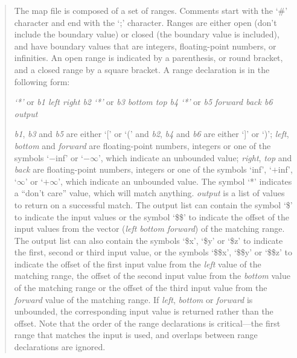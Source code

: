 \begin{quote}
The map file is composed of a set of ranges.
Comments start with the `\#' character and end with the `;' character.
Ranges are either open (don't include the boundary value) or closed (the boundary value is included),
and have boundary values that are integers, floating-point numbers, or infinities.
An open range is indicated by a parenthesis, or round bracket, and a closed range by a square bracket.
A range declaration is in the following form:

\centerline{\emph{`*'} or \emph{b1 left right b2} \emph{`*'} or \emph{b3 bottom top b4} \emph{`*'} or \emph{b5 forward back b6 output}}

\emph{b1}, \emph{b3} and \emph{b5} are either `[' or `(' and \emph{b2}, \emph{b4} and \emph{b6} are
either `]' or `)';
\emph{left}, \emph{bottom} and \emph{forward} are floating-point numbers, integers or one of the symbols `$-$inf' or
`$-\infty$', which indicate an unbounded value;
\emph{right}, \emph{top} and \emph{back} are floating-point numbers, integers or one of the symbols `inf', `$+$inf',
`$\infty$' or `$+\infty$', which indicate an unbounded value.
The symbol `*' indicates a ``don't care'' value, which will match anything.
\emph{output} is a list of values to return on a successful match.
The output list can contain the symbol `\$' to indicate the input values or the symbol `\$\$' to
indicate the offset of the input values from the vector (\emph{left} \emph{bottom} \emph{forward}) of the
matching range.
The output list can also contain the symbols `\$x', `\$y' or `\$z' to indicate the first, second or third
input value, or the symbols `\$\$x', `\$\$y' or `\$\$z' to indicate the offset of the first input value from
the \emph{left} value of the matching range, the offset of the second input value from the \emph{bottom} value
of the matching range or the offset of the third input value from the \emph{forward} value of the matching
range.
If \emph{left}, \emph{bottom} or \emph{forward} is unbounded, the corresponding input value is returned rather
than the offset.
Note that the order of the range declarations is critical---the first range that matches the input
is used, and overlaps between range declarations are ignored.
\end{quote}

\objItemMessage

\objItemComments

